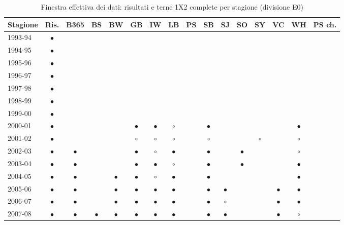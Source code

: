 \begin{table}[htbp]
\centering
\footnotesize
\setlength{\tabcolsep}{2.5pt}
\caption{Finestra effettiva dei dati: risultati e terne 1X2 complete per stagione (divisione E0)}
\label{tab:c3_1_finestra_dati}
\begin{tabular}{lccccccccccccccc}
\toprule
Stagione & Ris. & B365 & BS & BW & GB & IW & LB & PS & SB & SJ & SO & SY & VC & WH & PS ch. \\
\midrule
1993-94 & $\bullet$ &  &  &  &  &  &  &  &  &  &  &  &  &  &  \\
1994-95 & $\bullet$ &  &  &  &  &  &  &  &  &  &  &  &  &  &  \\
1995-96 & $\bullet$ &  &  &  &  &  &  &  &  &  &  &  &  &  &  \\
1996-97 & $\bullet$ &  &  &  &  &  &  &  &  &  &  &  &  &  &  \\
1997-98 & $\bullet$ &  &  &  &  &  &  &  &  &  &  &  &  &  &  \\
1998-99 & $\bullet$ &  &  &  &  &  &  &  &  &  &  &  &  &  &  \\
1999-00 & $\bullet$ &  &  &  &  &  &  &  &  &  &  &  &  &  &  \\
2000-01 & $\bullet$ &  &  &  & $\bullet$ & $\bullet$ & $\circ$ &  & $\bullet$ &  &  &  &  & $\bullet$ &  \\
2001-02 & $\bullet$ &  &  &  & $\circ$ & $\circ$ & $\circ$ &  & $\circ$ &  &  & $\circ$ &  & $\circ$ &  \\
2002-03 & $\bullet$ & $\bullet$ &  &  & $\bullet$ & $\circ$ & $\bullet$ &  & $\bullet$ &  & $\bullet$ &  &  & $\circ$ &  \\
2003-04 & $\bullet$ & $\bullet$ &  &  & $\bullet$ & $\bullet$ & $\circ$ &  & $\bullet$ &  & $\bullet$ &  &  & $\bullet$ &  \\
2004-05 & $\bullet$ & $\bullet$ &  & $\bullet$ & $\bullet$ & $\circ$ & $\bullet$ &  & $\bullet$ &  &  &  &  & $\bullet$ &  \\
2005-06 & $\bullet$ & $\bullet$ &  & $\bullet$ & $\bullet$ & $\bullet$ & $\bullet$ &  & $\bullet$ & $\bullet$ &  &  & $\bullet$ & $\bullet$ &  \\
2006-07 & $\bullet$ & $\bullet$ &  & $\bullet$ & $\bullet$ & $\bullet$ & $\bullet$ &  & $\bullet$ & $\circ$ &  &  & $\bullet$ & $\bullet$ &  \\
2007-08 & $\bullet$ & $\bullet$ & $\bullet$ & $\bullet$ & $\bullet$ & $\bullet$ & $\bullet$ &  & $\bullet$ & $\bullet$ &  &  & $\bullet$ & $\circ$ &  \\

\end{tabular}
\end{table}

